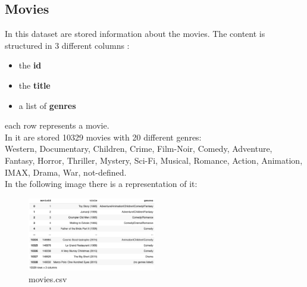 \documentclass{article}
\begin{document}
\subsection{Movies}
In this dataset are stored information about the movies. The content is structured in 3 different columns : 
\begin{itemize}
      \item the \textbf{id}
      \item the \textbf{title}
      \item a list of \textbf{genres}
\end{itemize}
each row represents a movie.\\ In it are stored 10329 movies with 20 different genres:\\ Western, Documentary, Children, Crime, Film-Noir, Comedy, Adventure, Fantasy, Horror, Thriller, Mystery, Sci-Fi, Musical, Romance, Action, Animation, IMAX, Drama, War, not-defined. \\
In the following image there is a representation of it:
\begin{figure}[ht]
      \begin{center}
            \includegraphics[width=0.5\textwidth]{images/movies data.png}
      \end{center}
      \caption{movies.csv}
      \label{fig:movies.csv}
\end{figure}
\end{document}
